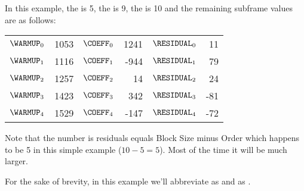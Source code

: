 In this example, the  is 5, the  is 9,
the  is 10
and the remaining subframe values are as follows:

\begin{table}[h]
\begin{tabular}{r r | r r | r r }
$\WARMUP_0$ & 1053 &
$\COEFF_0$ & 1241 &
$\RESIDUAL_0$ & 11 \\
$\WARMUP_1$ & 1116 &
$\COEFF_1$ & -944 &
$\RESIDUAL_1$ & 79 \\
$\WARMUP_2$ & 1257 &
$\COEFF_2$ & 14 &
$\RESIDUAL_2$ & 24 \\
$\WARMUP_3$ & 1423 &
$\COEFF_3$ & 342 &
$\RESIDUAL_3$ & -81 \\
$\WARMUP_4$ & 1529 &
$\COEFF_4$ & -147 &
$\RESIDUAL_4$ & -72 \\
\end{tabular}
\end{table}
\par
\noindent
Note that the number is residuals equals Block Size minus Order
which happens to be 5 in this simple example ($10 - 5 = 5$).
Most of the time it will be much larger.

For the sake of brevity, in this example we'll abbreviate
 as  and  as .

